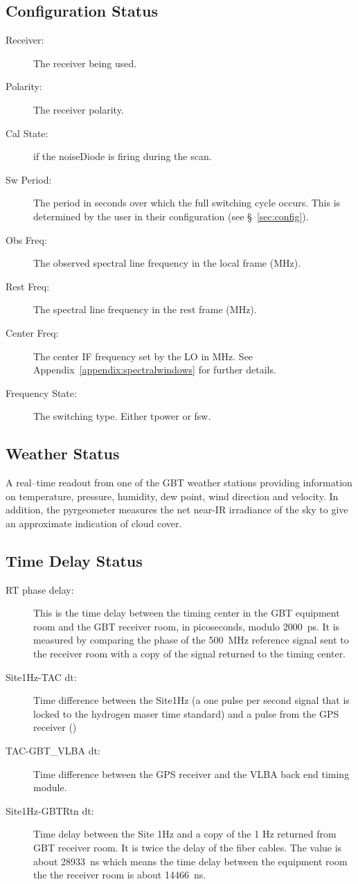\subsection{Configuration Status}
\begin{description}
\item[Receiver:] The receiver being used.
\item[Polarity:] The receiver polarity.
\item[Cal State:]  if the \gls{noiseDiode} is firing during the scan. 
\item[Sw Period:] The period in seconds over which the full switching cycle occurs.
This is determined by the user in their configuration (see \S~\ref{sec:config}).
\item[Obs Freq:] The observed spectral line frequency in the local frame (MHz).
\item[Rest Freq:] The spectral line frequency in the rest frame (MHz).
\item[Center Freq:] The center \gls{IF} frequency set by the \gls{LO} in MHz.  See
Appendix~\ref{appendix:spectralwindows} for further details.
\item[Frequency State:] The switching type.  Either \gls{tpower} or \gls{fsw}.
\end{description}

\subsection{Weather Status}

A real--time readout from one of the \gls{GBT} weather stations providing information on
temperature, pressure, humidity, dew point, wind direction and velocity. In addition,
the pyrgeometer measures the net near-IR irradiance of the sky to give an approximate
indication of cloud cover.

\subsection{Time Delay Status}
\begin{description}
\item[RT phase delay:] This is the time delay between the timing center in the \gls{GBT}
equipment room and the \gls{GBT} receiver room, in picoseconds, modulo 2000~ps.  It is measured
by comparing the phase of the 500~MHz reference signal  sent to the receiver room with a
copy of the signal returned to the  timing center.
\item[Site1Hz-TAC dt:] Time difference between the Site1Hz (a one pulse per second signal
that is locked to the hydrogen maser time standard) and a pulse from the GPS receiver
()
\item[TAC-GBT\_VLBA dt:] Time difference between the GPS receiver and the \gls{VLBA} back end
timing module.
\item[Site1Hz-GBTRtn dt:] Time delay between the Site 1Hz and a copy of the 1 Hz returned
from \gls{GBT} receiver room.  It is twice the delay of the fiber cables. The value is about
28933~ns which means the time delay between the equipment room the the receiver room is
about 14466~ns.
\end{description}

